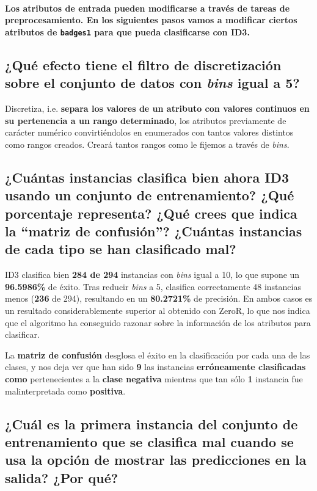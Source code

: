 \documentclass[12pt]{article}
\begin{document}
\paragraph{\small Los atributos de entrada pueden modificarse a través de tareas de preprocesamiento. En los siguientes pasos vamos a modificar ciertos atributos de \texttt{badges1} para que pueda clasificarse con ID3.}

\subsection*{\small ¿Qué efecto tiene el filtro de discretización sobre el conjunto de datos con \emph{bins} igual a 5?}

Discretiza, i.e. \textbf{separa los valores de un atributo con valores continuos en su pertenencia a un rango determinado}, los atributos previamente de carácter numérico convirtiéndolos en enumerados con tantos valores distintos como rangos creados. Creará tantos rangos como le fijemos a través de \emph{bins}.

\subsection*{\small ¿Cuántas instancias clasifica bien ahora ID3 usando un conjunto de entrenamiento? ¿Qué porcentaje representa? ¿Qué crees que indica la ``matriz de confusión''? ¿Cuántas instancias de cada tipo se han clasificado mal?}

ID3 clasifica bien \textbf{284 de 294} instancias con \emph{bins} igual a 10, lo que supone un \textbf{96.5986\%} de éxito. Tras reducir \emph{bins} a 5, clasifica correctamente 48 instancias menos (\textbf{236} de 294), resultando en un \textbf{80.2721\%} de precisión. En ambos casos es un resultado considerablemente superior al obtenido con ZeroR, lo que nos indica que el algoritmo ha conseguido razonar sobre la información de los atributos para clasificar.

La \textbf{matriz de confusión} desglosa el éxito en la clasificación por cada una de las clases, y nos deja ver que han sido \textbf{9} las instancias \textbf{erróneamente clasificadas como} pertenecientes a la \textbf{clase negativa} mientras que tan sólo \textbf{1} instancia fue malinterpretada como \textbf{positiva}.

\subsection*{\small ¿Cuál es la primera instancia del conjunto de entrenamiento que se clasifica mal cuando se usa la opción de mostrar las predicciones en la salida? ¿Por qué?}
\end{document}
